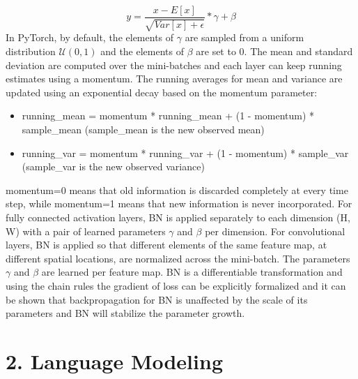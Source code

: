 \documentclass[11pt]{article}
\newcommand{\0}{\mat{0}}
\begin{document}
\begin{itemize}
    	\[
    		y =\frac{x-E[x]} {\sqrt{Var[x]+\epsilon}} * \gamma + \beta
    	\]
	In PyTorch,  by default, the elements of $\gamma$ are sampled from a uniform distribution $\mathcal{U}(0,1)$ and the elements of $\beta$ are set to 0. The mean and standard deviation are computed over the mini-batches and each layer can keep running estimates using a momentum. The running averages for mean and variance are updated using an exponential decay based on the momentum parameter:
	\begin{itemize}
    		\item running\_mean = momentum * running\_mean + (1 - momentum) * sample\_mean (sample\_mean is the new observed mean)
    		\item running\_var = momentum * running\_var + (1 - momentum) * sample\_var (sample\_var is the new observed variance)
    	\end{itemize}   
	momentum=0 means that old information is discarded completely at every time step, while momentum=1 means that new information is never incorporated. For fully connected activation layers, BN is applied separately to each dimension (H, W) with a pair of learned parameters $\gamma$ and $\beta$ per dimension. For convolutional layers, BN is applied so that different elements of the same feature map, at different spatial locations, are normalized across the mini-batch. The parameters $\gamma$ and $\beta$ are learned per feature map. BN is a differentiable transformation and using the chain rules the gradient of loss can be explicitly formalized and it can be shown that backpropagation for BN is unaffected by the scale of its parameters and BN will stabilize the parameter growth. 
 \end{itemize}   
 
 \section*{2. Language Modeling}
 
\end{document}

